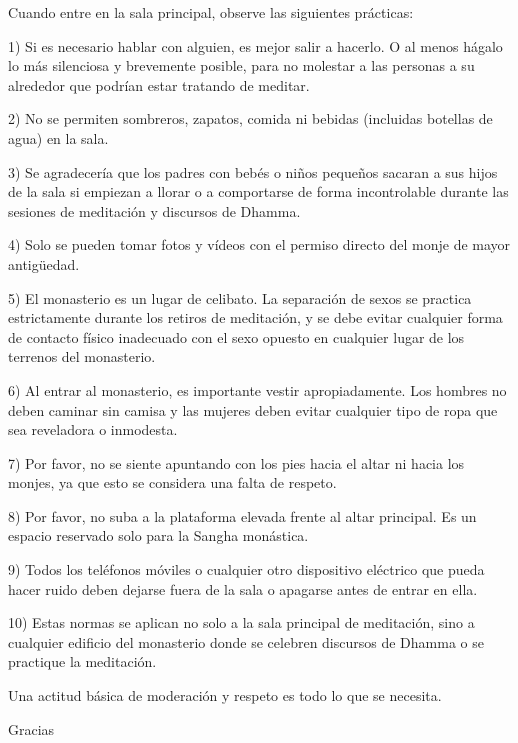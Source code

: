 Cuando entre en la sala principal, observe las siguientes prácticas:

1) Si es necesario hablar con alguien, es mejor salir a hacerlo. O al menos hágalo lo más silenciosa y brevemente posible, para no molestar a las personas a su alrededor que podrían estar tratando de meditar.

2) No se permiten sombreros, zapatos, comida ni bebidas (incluidas botellas de agua) en la sala.

3) Se agradecería que los padres con bebés o niños pequeños sacaran a sus hijos de la sala si empiezan a llorar o a comportarse de forma incontrolable durante las sesiones de meditación y discursos de Dhamma.

4) Solo se pueden tomar fotos y vídeos con el permiso directo del monje de mayor antigüedad.

5) El monasterio es un lugar de celibato. La separación de sexos se practica estrictamente durante los retiros de meditación, y se debe evitar cualquier forma de contacto físico inadecuado con el sexo opuesto en cualquier lugar de los terrenos del monasterio.

6) Al entrar al monasterio, es importante vestir apropiadamente. Los hombres no deben caminar sin camisa y las mujeres deben evitar cualquier tipo de ropa que sea reveladora o inmodesta.

7) Por favor, no se siente apuntando con los pies hacia el altar ni hacia los monjes, ya que esto se considera una falta de respeto.

8) Por favor, no suba a la plataforma elevada frente al altar principal. Es un espacio reservado solo para la Sangha monástica.

9) Todos los teléfonos móviles o cualquier otro dispositivo eléctrico que pueda hacer ruido deben dejarse fuera de la sala o apagarse antes de entrar en ella.

10) Estas normas se aplican no solo a la sala principal de meditación, sino a cualquier edificio del monasterio donde se celebren discursos de Dhamma o se practique la meditación.

Una actitud básica de moderación y respeto es todo lo que se necesita.

Gracias




